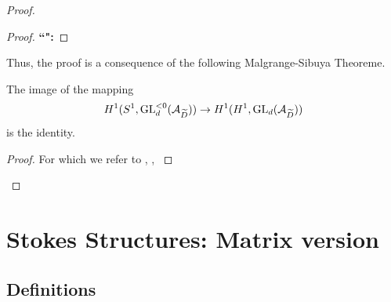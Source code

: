\begin{proof}
\begin{proof}
    \textbf{``\Leftarrow{}":}
    \TODO
  \end{proof}

  Thus, the proof is a consequence of the following Malgrange-Sibuya Theoreme.
  \begin{thm}
    The image of the mapping
    \[
      H^1(S^1,\operatorname{GL}_d^{<0}(\mathcal{A}_{\widetilde D}))
      \to
      H^1(H^1,\operatorname{GL}_d(\mathcal{A}_{\widetilde D}))
    \] 
    is the identity.
  \end{thm}
  \begin{proof}
     For which we refer to 
     \cite[Th.A.1]{Malgrange1983},
     \cite[Th.6.4.1]{sibuya1990Linear},
     \cite{babbitt1989local}
  \end{proof}
\end{proof}

\section{Stokes Structures: Matrix version}
\begin{comment}
  See
  \begin{itemize}
    \item \cite{Loday1994}
    \item \cite{boalch} and \cite{thboalch}
    \item \cite{babbitt1989local}
  \end{itemize}
\end{comment}

\subsection{Definitions}
